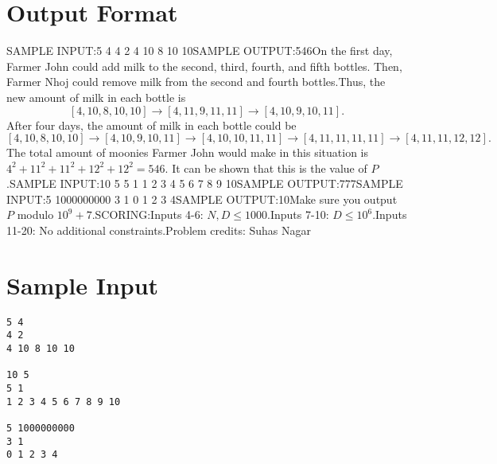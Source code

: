 \documentclass[12pt]{article}
\begin{document}
\section*{Output Format}
SAMPLE INPUT:5 4
4 2
4 10 8 10 10SAMPLE OUTPUT:546On the first day, Farmer John could add milk to the second, third,
fourth, and fifth bottles. Then, Farmer Nhoj could remove milk from the
second and fourth bottles.Thus, the new amount of milk in each bottle is$$[4, 10, 8, 10, 10] \to [4, 11, 9, 11, 11] \to [4, 10, 9, 10, 11].$$After four days, the amount of milk in each bottle could be$$[4, 10, 8, 10, 10] \to [4, 10, 9, 10, 11] \to [4, 10, 10, 11, 11] \to [4, 11, 11, 11, 11] \to [4, 11, 11, 12, 12].$$The total amount of moonies Farmer John would make in this situation is $4^2+11^2+11^2+12^2+12^2 = 546$. It can be shown that this is the value
of $P$.SAMPLE INPUT:10 5
5 1
1 2 3 4 5 6 7 8 9 10SAMPLE OUTPUT:777SAMPLE INPUT:5 1000000000
3 1
0 1 2 3 4SAMPLE OUTPUT:10Make sure you output $P$ modulo $10^9+7$.SCORING:Inputs 4-6: $N,D\le 1000$.Inputs 7-10: $D\le 10^6$.Inputs 11-20: No additional constraints.Problem credits: Suhas Nagar

\section*{Sample Input}
\begin{verbatim}
5 4
4 2
4 10 8 10 10

10 5
5 1
1 2 3 4 5 6 7 8 9 10

5 1000000000
3 1
0 1 2 3 4
\end{verbatim}
\end{document}
